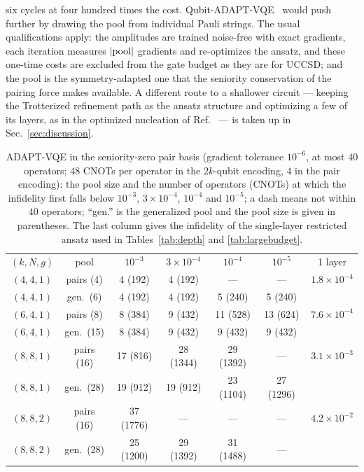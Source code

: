 \documentclass[
  aps,            %
  prc,            %
  reprint,        %
  superscriptaddress,
  floatfix,
  nofootinbib
]{revtex4-2}
\begin{document}
six cycles at four hundred times the cost.  Qubit-ADAPT-VQE~\cite{Tang2021}
would push further by drawing the pool from individual Pauli strings.  The
usual qualifications apply: the amplitudes are trained noise-free with
exact gradients, each iteration measures $\abs{\rm pool}$ gradients and
re-optimizes the ansatz, and these one-time costs are excluded from the
gate budget as they are for UCCSD; and the pool is the symmetry-adapted one
that the seniority conservation of the pairing force makes available.  A
different route to a shallower circuit --- keeping the Trotterized
refinement path as the ansatz structure and optimizing a few of its layers,
as in the optimized nucleation of Ref.~\cite{Sadia2026} --- is taken up in
Sec.~\ref{sec:discussion}.

\begin{table}[t]
\caption{\label{tab:adapt}ADAPT-VQE in the seniority-zero pair basis
(gradient tolerance $10^{-6}$, at most $40$ operators; $48$ CNOTs per
operator in the $2k$-qubit encoding, $4$ in the pair encoding): the pool
size and the number of operators (CNOTs) at which the infidelity first
falls below $10^{-3}$, $3\times10^{-4}$, $10^{-4}$ and $10^{-5}$; a dash
means not within $40$ operators; ``gen.'' is the generalized pool and the
pool size is given in parentheses.  The
last column gives the infidelity of the single-layer restricted ansatz used
in Tables~\ref{tab:depth} and \ref{tab:largebudget}.}
\footnotesize
\begin{ruledtabular}
\begin{tabular}{cc cccc c}
$(k,N,g)$ & pool & $10^{-3}$ & $3{\times}10^{-4}$ & $10^{-4}$ & $10^{-5}$ & 1 layer\\
\colrule
$(4,4,1)$ & pairs (4) & 4 (192) & 4 (192) & --- & --- & $1.8\times10^{-4}$\\
$(4,4,1)$ & gen.\ (6) & 4 (192) & 4 (192) & 5 (240) & 5 (240) & \\
$(6,4,1)$ & pairs (8) & 8 (384) & 9 (432) & 11 (528) & 13 (624) & $7.6\times10^{-4}$\\
$(6,4,1)$ & gen.\ (15) & 8 (384) & 9 (432) & 9 (432) & 9 (432) & \\
$(8,8,1)$ & pairs (16) & 17 (816) & 28 (1344) & 29 (1392) & --- & $3.1\times10^{-3}$\\
$(8,8,1)$ & gen.\ (28) & 19 (912) & 19 (912) & 23 (1104) & 27 (1296) & \\
$(8,8,2)$ & pairs (16) & 37 (1776) & --- & --- & --- & $4.2\times10^{-2}$\\
$(8,8,2)$ & gen.\ (28) & 25 (1200) & 29 (1392) & 31 (1488) & --- & \\
\end{tabular}
\end{ruledtabular}
\end{table}
\end{document}
